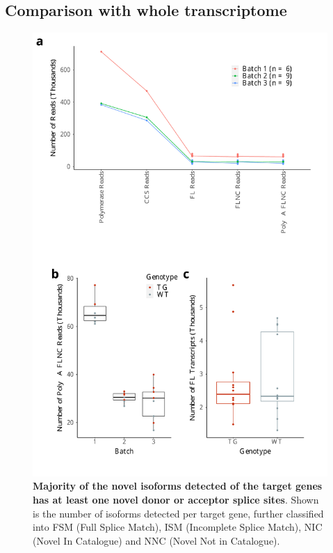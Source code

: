 \subsection{Comparison with whole transcriptome}


\begin{figure}[!htp]
	\begin{center}
		\includegraphics[page=6,scale = 0.55]{Figures/TargetedTranscriptome.pdf}
	\end{center}
	\captionsetup{width=0.95\textwidth}
	\caption[Classification of novel and known isoforms from Targeted Sequencing in mouse cortex]%
	{\textbf{Majority of the novel isoforms detected of the target genes has at least one novel donor or acceptor splice sites}. Shown is the number of isoforms detected per target gene, further classified into FSM (Full Splice Match), ISM (Incomplete Splice Match), NIC (Novel In Catalogue) and NNC (Novel Not in Catalogue).}
\end{figure}

